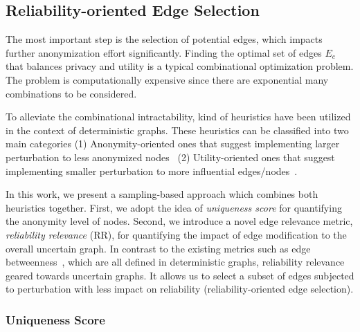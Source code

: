 \subsection{Reliability-oriented Edge Selection} 
\begin{sloppypar}
The most important step is the selection of potential edges, which impacts further anonymization effort significantly. Finding the optimal set of edges $E_{c}$ that balances privacy and utility is a typical combinational optimization problem. The problem is computationally expensive since there are exponential many combinations to be considered.     

To alleviate the combinational intractability, kind of heuristics have been utilized in the context of deterministic graphs. These heuristics can be classified into two main categories  (1) Anonymity-oriented ones that suggest implementing larger perturbation to less anonymized nodes~\cite{Ying2009} (2) Utility-oriented ones that suggest implementing smaller perturbation to more influential edges/nodes~\cite{casasprivacy,Ying_Randomizing_2008}. 
\end{sloppypar}

In this work, we present a sampling-based approach which combines both heuristics together. First, we adopt the idea of \emph{uniqueness score} for quantifying the anonymity level of nodes. Second, we introduce a novel edge relevance metric, \emph{reliability relevance} (RR), for quantifying the impact of edge modification to the overall uncertain graph. In contrast to the existing metrics such as edge betweenness~\cite{casasprivacy}, which are all defined in deterministic graphs, reliability relevance geared towards uncertain graphs. It allows us to select a subset of edges subjected to perturbation with less impact on reliability (reliability-oriented edge selection). 

\subsubsection{Uniqueness Score}
\label{sec:uniqueness}

